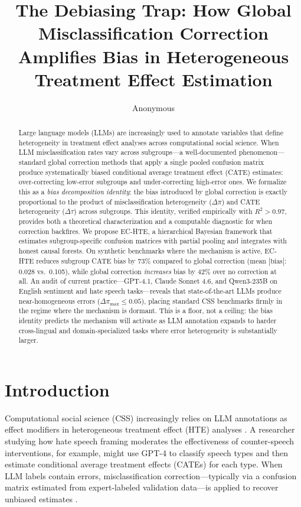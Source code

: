 \documentclass[11pt,a4paper]{article}
\title{The Debiasing Trap: How Global Misclassification Correction\\Amplifies Bias in Heterogeneous Treatment Effect Estimation}
\author{Anonymous}
\begin{document}
\maketitle

\begin{abstract}
Large language models (LLMs) are increasingly used to annotate variables that define heterogeneity in treatment effect analyses across computational social science.
When LLM misclassification rates vary across subgroups---a well-documented phenomenon---standard global correction methods that apply a single pooled confusion matrix produce systematically biased conditional average treatment effect (CATE) estimates: over-correcting low-error subgroups and under-correcting high-error ones.
We formalize this as a \emph{bias decomposition identity}: the bias introduced by global correction is exactly proportional to the product of misclassification heterogeneity ($\Delta\pi$) and CATE heterogeneity ($\Delta\tau$) across subgroups.
This identity, verified empirically with $R^2 > 0.97$, provides both a theoretical characterization and a computable diagnostic for when correction backfires.
We propose EC-HTE, a hierarchical Bayesian framework that estimates subgroup-specific confusion matrices with partial pooling and integrates with honest causal forests.
On synthetic benchmarks where the mechanism is active, EC-HTE reduces subgroup CATE bias by 73\% compared to global correction (mean $|\text{bias}|$: 0.028 vs.\ 0.105), while global correction \emph{increases} bias by 42\% over no correction at all.
An audit of current practice---GPT-4.1, Claude Sonnet 4.6, and Qwen3-235B on English sentiment and hate speech tasks---reveals that state-of-the-art LLMs produce near-homogeneous errors ($\Delta\pi_{\max} \leq 0.05$), placing standard CSS benchmarks firmly in the regime where the mechanism is dormant.
This is a floor, not a ceiling: the bias identity predicts the mechanism will activate as LLM annotation expands to harder cross-lingual and domain-specialized tasks where error heterogeneity is substantially larger.
\end{abstract}

\section{Introduction}

Computational social science (CSS) increasingly relies on LLM annotations as effect modifiers in heterogeneous treatment effect (HTE) analyses \cite{tornberg2024chatgpt,ziems2024can,gilardi2023chatgpt}.
A researcher studying how hate speech framing moderates the effectiveness of counter-speech interventions, for example, might use GPT-4 to classify speech types and then estimate conditional average treatment effects (CATEs) for each type.
When LLM labels contain errors, misclassification correction---typically via a confusion matrix estimated from expert-labeled validation data---is applied to recover unbiased estimates \cite{angelopoulos2023prediction,egami2024using}.
\end{document}
